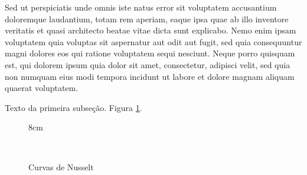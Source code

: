 Sed ut perspiciatis unde omnis iste natus error sit voluptatem accusantium doloremque laudantium, totam rem aperiam, eaque ipsa quae ab illo inventore veritatis et quasi architecto beatae vitae dicta sunt explicabo. Nemo enim ipsam voluptatem quia voluptas sit aspernatur aut odit aut fugit, sed quia consequuntur magni dolores eos qui ratione voluptatem sequi nesciunt. Neque porro quisquam est, qui dolorem ipsum quia dolor sit amet, consectetur, adipisci velit, sed quia non numquam eius modi tempora incidunt ut labore et dolore magnam aliquam quaerat voluptatem.


Texto da primeira subseção. Figura \ref{outro.rotulo}.


\begin{figure}[!h]{8cm}
    \centering
	\caption{Curvas de Nusselt} \label{outro.rotulo}
	\\

\end{figure}
